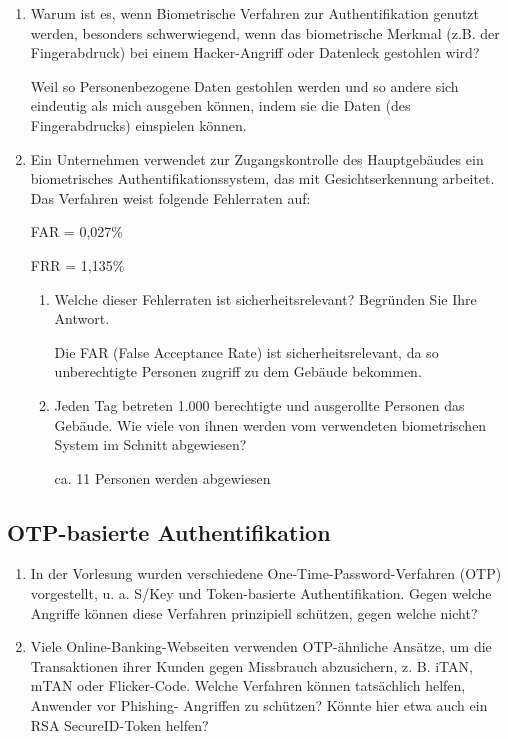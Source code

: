 \documentclass[a4paper]{article}
\begin{document}
\begin{enumerate}
    \item Warum ist es, wenn Biometrische Verfahren zur Authentifikation genutzt werden, besonders schwerwiegend, wenn das biometrische Merkmal (z.B. der Fingerabdruck) bei einem Hacker-Angriff oder Datenleck gestohlen wird?
    
    Weil so Personenbezogene Daten gestohlen werden und so andere sich eindeutig als mich ausgeben können, indem sie die Daten (des Fingerabdrucks) einspielen können.
    \item Ein Unternehmen verwendet zur Zugangskontrolle des Hauptgebäudes ein biometrisches Authentifikationssystem, das mit Gesichtserkennung arbeitet. Das Verfahren weist folgende Fehlerraten auf:
    
    \begin{center}
        FAR = 0,027\%

        FRR = 1,135\%
    \end{center}

    \begin{enumerate}
        \item Welche dieser Fehlerraten ist sicherheitsrelevant? Begründen Sie Ihre Antwort.
        
        Die FAR (False Acceptance Rate) ist sicherheitsrelevant, da so unberechtigte Personen zugriff zu dem Gebäude bekommen.
        \item Jeden Tag betreten 1.000 berechtigte und ausgerollte Personen das Gebäude. Wie viele von ihnen werden vom verwendeten biometrischen System im Schnitt abgewiesen?
        
        ca. 11 Personen werden abgewiesen
    \end{enumerate}
\end{enumerate}

\subsection{OTP-basierte Authentifikation}

\begin{enumerate}
    \item In der Vorlesung wurden verschiedene One-Time-Password-Verfahren (OTP) vorgestellt, u. a. S/Key und Token-basierte Authentifikation. Gegen welche Angriffe können diese Verfahren prinzipiell schützen, gegen welche nicht?
    

    \item Viele Online-Banking-Webseiten verwenden OTP-ähnliche Ansätze, um die Transaktionen ihrer Kunden gegen Missbrauch abzusichern, z. B. iTAN, mTAN oder Flicker-Code. Welche Verfahren können tatsächlich helfen, Anwender vor Phishing- Angriffen zu schützen? Könnte hier etwa auch ein RSA SecureID-Token helfen?
    

\end{enumerate}
\end{document}
